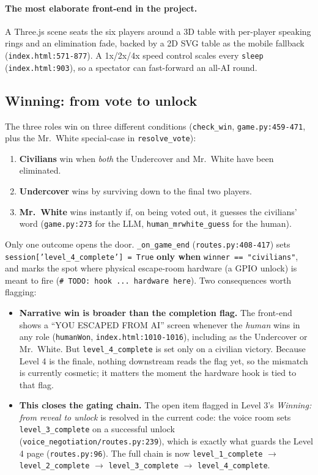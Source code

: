 \documentclass[11pt,a4paper]{article}
\begin{document}
\paragraph{The most elaborate front-end in the project.} A Three.js scene seats
the six players around a 3D table with per-player speaking rings and an
elimination fade, backed by a 2D SVG table as the mobile fallback
(\texttt{index.html:571-877}). A 1x/2x/4x speed control scales every
\texttt{sleep} (\texttt{index.html:903}), so a spectator can fast-forward an
all-AI round.

\subsection{Winning: from vote to unlock}
The three roles win on three different conditions (\texttt{check\_win},
\texttt{game.py:459-471}, plus the Mr.\ White special-case in
\texttt{resolve\_vote}):
\begin{enumerate}[leftmargin=*,itemsep=2pt]
    \item \textbf{Civilians} win when \emph{both} the Undercover and Mr.\ White
    have been eliminated.
    \item \textbf{Undercover} wins by surviving down to the final two players.
    \item \textbf{Mr.\ White} wins instantly if, on being voted out, it guesses
    the civilians' word (\texttt{game.py:273} for the LLM,
    \texttt{human\_mrwhite\_guess} for the human).
\end{enumerate}
\noindent Only one outcome opens the door. \texttt{\_on\_game\_end}
(\texttt{routes.py:408-417}) sets \texttt{session['level\_4\_complete'] = True}
\textbf{only when} \texttt{winner == "civilians"}, and marks the spot where
physical escape-room hardware (a GPIO unlock) is meant to fire
(\texttt{\# TODO: hook ... hardware here}). Two consequences worth flagging:
\begin{itemize}[leftmargin=*,itemsep=2pt]
    \item \textbf{Narrative win is broader than the completion flag.} The
    front-end shows a ``YOU ESCAPED FROM AI'' screen whenever the \emph{human}
    wins in any role (\texttt{humanWon}, \texttt{index.html:1010-1016}), including
    as the Undercover or Mr.\ White. But \texttt{level\_4\_complete} is set only on
    a civilian victory. Because Level 4 is the finale, nothing downstream reads
    the flag yet, so the mismatch is currently cosmetic; it matters the moment the
    hardware hook is tied to that flag.
    \item \textbf{This closes the gating chain.} The open item flagged in Level
    3's \emph{Winning: from reveal to unlock} is resolved in the current code: the
    voice room sets \texttt{level\_3\_complete} on a successful unlock
    (\texttt{voice\_negotiation/routes.py:239}), which is exactly what guards the
    Level 4 page (\texttt{routes.py:96}). The full chain is now
    \texttt{level\_1\_complete} $\rightarrow$ \texttt{level\_2\_complete}
    $\rightarrow$ \texttt{level\_3\_complete} $\rightarrow$
    \texttt{level\_4\_complete}.
\end{itemize}
\end{document}
